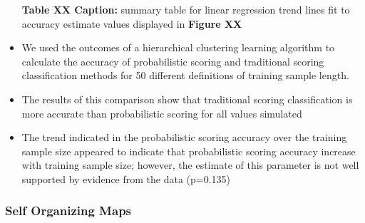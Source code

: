 \documentclass[12pt,]{article}
\begin{document}
\begin{itemize}
  \textbf{Table XX Caption:} summary table for linear regression trend
  lines fit to accuracy estimate values displayed in \textbf{Figure XX}
\item
  We used the outcomes of a hierarchical clustering learning algorithm
  to calculate the accuracy of probabilistic scoring and traditional
  scoring classification methods for 50 different definitions of
  training sample length.
\item
  The results of this comparison show that traditional scoring
  classification is more accurate than probabilistic scoring for all
  values simulated
\item
  The trend indicated in the probabilistic scoring accuracy over the
  training sample size appeared to indicate that probabilistic scoring
  accuracy increase with training sample size; however, the estimate of
  this parameter is not well supported by evidence from the data
  (p=0.135)
\end{itemize}

\hypertarget{self-organizing-maps-1}{%
\subsubsection{Self Organizing Maps}\label{self-organizing-maps-1}}
\end{document}
